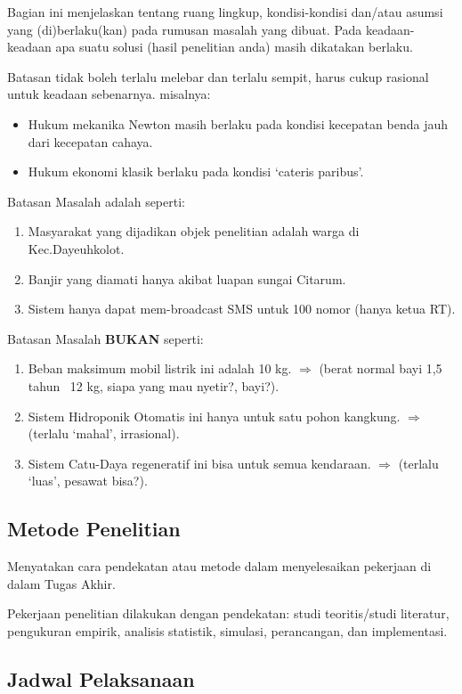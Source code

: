 \documentclass{final_project}
\begin{document}
Bagian ini menjelaskan tentang ruang lingkup, kondisi-kondisi dan/atau asumsi yang (di)berlaku(kan) pada rumusan masalah yang dibuat. Pada keadaan-keadaan apa suatu solusi (hasil penelitian anda) masih dikatakan berlaku.

Batasan tidak boleh terlalu melebar dan terlalu sempit, harus cukup rasional untuk keadaan sebenarnya. misalnya:
\begin{itemize}
    \item Hukum mekanika Newton masih berlaku pada kondisi kecepatan benda jauh dari kecepatan cahaya.
    \item Hukum ekonomi klasik berlaku pada kondisi ‘cateris paribus’.
\end{itemize}

Batasan Masalah adalah seperti:
\begin{enumerate}
    \item Masyarakat yang dijadikan objek penelitian adalah warga di Kec.Dayeuhkolot.
    \item Banjir yang diamati hanya akibat luapan sungai Citarum.
    \item Sistem hanya dapat mem-broadcast SMS untuk 100 nomor (hanya ketua RT).
\end{enumerate}

Batasan Masalah \textbf{BUKAN} seperti:
\begin{enumerate}
    \item Beban maksimum mobil listrik ini adalah 10 kg. $\Rightarrow$ (berat normal bayi 1,5 tahun ~12 kg, siapa yang mau nyetir?, bayi?).
    \item Sistem Hidroponik Otomatis ini hanya untuk satu pohon kangkung. $\Rightarrow$ (terlalu ‘mahal’, irrasional).
    \item Sistem Catu-Daya regeneratif ini bisa untuk semua kendaraan. $\Rightarrow$ (terlalu ‘luas’, pesawat bisa?).
\end{enumerate}

\subsection{Metode Penelitian}

Menyatakan cara pendekatan atau metode dalam menyelesaikan pekerjaan di dalam Tugas Akhir.

Pekerjaan penelitian dilakukan dengan pendekatan: studi teoritis/studi literatur, pengukuran empirik, analisis statistik, simulasi, perancangan, dan implementasi.

\subsection{Jadwal Pelaksanaan}
\end{document}
